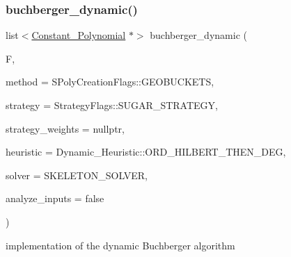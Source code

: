 \subsubsection{\texorpdfstring{buchberger\+\_\+dynamic()}{buchberger\_dynamic()}}
{\footnotesize\ttfamily list$<$\hyperlink{group__polygroup_class_constant___polynomial}{Constant\+\_\+\+Polynomial} $\ast$$>$ buchberger\+\_\+dynamic (\begin{DoxyParamCaption}\item[{const list$<$ \hyperlink{group__polygroup_class_abstract___polynomial}{Abstract\+\_\+\+Polynomial} $\ast$$>$ \&}]{F,  }\item[{\hyperlink{group___g_b_computation_ga73257b8a2d5cc826853a71b77d0cebf2}{S\+Poly\+Creation\+Flags}}]{method = {\ttfamily SPolyCreationFlags\+:\+:GEOBUCKETS},  }\item[{\hyperlink{group__strategygroup_ga0ee6c8e033547330e6b89929730007f4}{Strategy\+Flags}}]{strategy = {\ttfamily StrategyFlags\+:\+:SUGAR\+\_\+STRATEGY},  }\item[{W\+T\+\_\+\+T\+Y\+PE $\ast$}]{strategy\+\_\+weights = {\ttfamily nullptr},  }\item[{Dynamic\+\_\+\+Heuristic}]{heuristic = {\ttfamily Dynamic\+\_\+Heuristic\+:\+:ORD\+\_\+HILBERT\+\_\+THEN\+\_\+DEG},  }\item[{\hyperlink{group___g_b_computation_ga28fbbb9eb7d8b80ced05c8fa89b2bdac}{Dynamic\+Solver}}]{solver = {\ttfamily SKELETON\+\_\+SOLVER},  }\item[{bool}]{analyze\+\_\+inputs = {\ttfamily false} }\end{DoxyParamCaption})}



implementation of the dynamic Buchberger algorithm 


